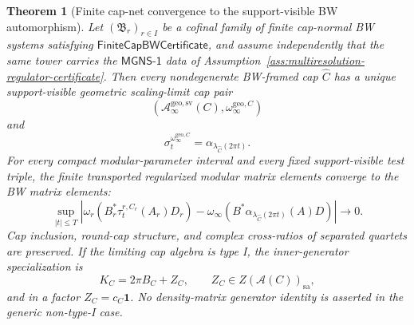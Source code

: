 \documentclass[11pt]{article}
\newtheorem{theorem}{Theorem}[section]
\begin{document}
\begin{theorem}[Finite cap-net convergence to the support-visible BW automorphism]\label{thm:finite-cap-bw-certificate}
Let \((\mathfrak B_r)_{r\in I}\) be a cofinal family of finite cap-normal BW systems satisfying
\(\mathsf{FiniteCapBWCertificate}\), and assume independently that the same
tower carries the \(\mathsf{MGNS\text{-}1}\) data of
Assumption~\ref{ass:multiresolution-regulator-certificate}. Then every
nondegenerate BW-framed cap \(\widehat C\) has a
unique support-visible geometric scaling-limit cap pair
\[
(\mathcal A_\infty^{\mathrm{geo,sv}}(C),\omega_\infty^{\mathrm{geo},C})
\]
and
\[
\boxed{\;
\sigma_t^{\omega_\infty^{\mathrm{geo},C}}
=
\alpha_{\lambda_{\widehat C}(2\pi t)} .
\;}
\]
For every compact modular-parameter interval and every fixed support-visible test triple,
the finite transported regularized modular matrix elements converge to the BW matrix elements:
\[
\sup_{|t|\le T}
\left|
\omega_r(B_r^\ast\tau_t^{r,C_r}(A_r)D_r)
-
\omega_\infty(B^\ast\alpha_{\lambda_{\widehat C}(2\pi t)}(A)D)
\right|\to0 .
\]
Cap inclusion, round-cap structure, and complex cross-ratios of separated quartets are preserved.
If the limiting cap algebra is type I, the inner-generator specialization is
\[
K_C=2\pi B_C+Z_C,\qquad Z_C\in Z(\mathcal A(C))_{\mathrm{sa}},
\]
and in a factor \(Z_C=c_C\mathbf1\). No density-matrix generator identity is asserted in the
generic non-type-I case.
\end{theorem}
\end{document}
